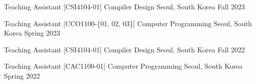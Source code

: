 

\begin{cventries}

  \cventry
    {Teaching Assistant} %
    {[CSI4104-01] Compiler Design} %
    {Seoul, South Korea} %
    {Fall 2023} %
    {}

  \cventry
    {Teaching Assistant} %
    {[CCO1100-\{01, 02, 03\}] Computer Programming} %
    {Seoul, South Korea} %
    {Spring 2023} %
    {}

  \cventry
    {Teaching Assistant} %
    {[CSI4104-01] Compiler Design} %
    {Seoul, South Korea} %
    {Fall 2022} %
    {}

  \cventry
    {Teaching Assistant} %
    {[CAC1100-01] Computer Programming} %
    {Seoul, South Korea} %
    {Spring 2022} %
    {}

\end{cventries}
